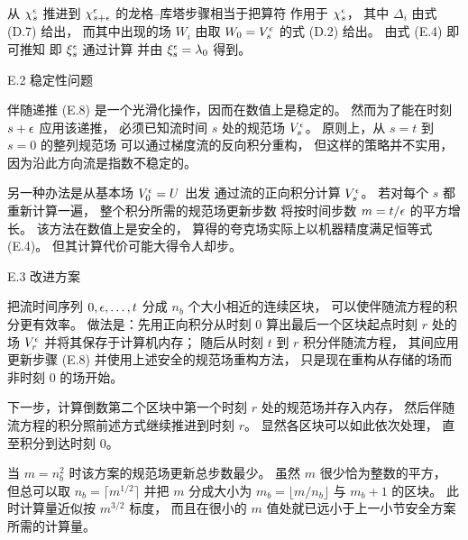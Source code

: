 从 $\chi_s^{\epsilon}$ 推进到 $\chi_{s+\epsilon}^{\epsilon}$
的龙格--库塔步骤相当于把算符
作用于 $\chi_s^{\epsilon}$，
其中 $\Delta_i$ 由式 (D.7) 给出，
而其中出现的场 $W_i$ 由取 $W_0=V_s^{\epsilon}$ 的式 (D.2) 给出。
由式 (E.4) 即可推知
即 $\xi_s^{\epsilon}$ 通过计算
并由 $\xi_s^{\epsilon}=\lambda_0$ 得到。


\lussubsec E.2 稳定性问题

伴随递推 (E.8) 是一个光滑化操作，因而在数值上是稳定的。
然而为了能在时刻 $s+\epsilon$ 应用该递推，
必须已知流时间 $s$ 处的规范场 $V_s^{\epsilon}$。
原则上，从 $s=t$ 到 $s=0$ 的整列规范场
可以通过梯度流的反向积分重构，
但这样的策略并不实用，
因为沿此方向流是指数不稳定的。

另一种办法是从基本场 $V_0^{\epsilon}=U$ 出发
通过流的正向积分计算 $V_s^{\epsilon}$。
若对每个 $s$ 都重新计算一遍，
整个积分所需的规范场更新步数
将按时间步数 $m=t/\epsilon$ 的平方增长。
该方法在数值上是安全的，
算得的夸克场实际上以机器精度满足恒等式 (E.4)。
但其计算代价可能大得令人却步。


\lussubsec E.3 改进方案

把流时间序列 $0,\epsilon,\ldots,t$ 分成 $n_b$ 个大小相近的连续区块，
可以使伴随流方程的积分更有效率。
做法是：先用正向积分从时刻 0 算出最后一个区块起点时刻 $r$ 处的场
$V_r^{\epsilon}$ 并将其保存于计算机内存；
随后从时刻 $t$ 到 $r$ 积分伴随流方程，
其间应用更新步骤 (E.8) 并使用上述安全的规范场重构方法，
只是现在重构从存储的场而非时刻 0 的场开始。

下一步，计算倒数第二个区块中第一个时刻 $r$ 处的规范场并存入内存，
然后伴随流方程的积分照前述方式继续推进到时刻 $r$。
显然各区块可以如此依次处理，
直至积分到达时刻 $0$。

当 $m=n_b^2$ 时该方案的规范场更新总步数最少。
虽然 $m$ 很少恰为整数的平方，
但总可以取 $n_b=\lceil m^{1/2}\rceil$
并把 $m$ 分成大小为 $m_b=\lfloor m/n_b\rfloor$ 与 $m_b+1$ 的区块。
此时计算量近似按 $m^{3/2}$ 标度，
而且在很小的 $m$ 值处就已远小于上一小节安全方案所需的计算量。


